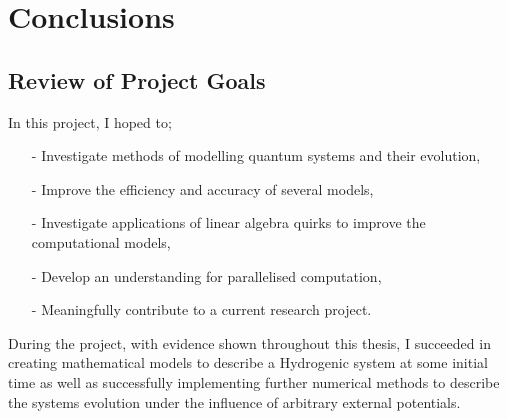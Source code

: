
\chapter{Conclusions} %

\label{Conc} %


\newcommand{\keyword}[1]{\textbf{#1}}
\newcommand{\tabhead}[1]{\textbf{#1}}
\newcommand{\code}[1]{\texttt{#1}}
\newcommand{\file}[1]{\texttt{\bfseries#1}}
\newcommand{\option}[1]{\texttt{\itshape#1}}


\section{Review of Project Goals}


In this project, I hoped to;
\begin{itemize}
	\item[-]{Investigate methods of modelling quantum systems and their evolution,}
	\item[-]{Improve the efficiency and accuracy of several models,}
	\item[-]{Investigate applications of linear algebra quirks to improve the computational models,}
	\item[-]{Develop an understanding for parallelised computation,}
	\item[-]{Meaningfully contribute to a current research project.}
\end{itemize}

During the project, with evidence shown throughout this thesis, I succeeded in creating mathematical models to describe a Hydrogenic system at some initial time as well as successfully implementing further numerical methods to describe the systems evolution under the influence of arbitrary external potentials.

